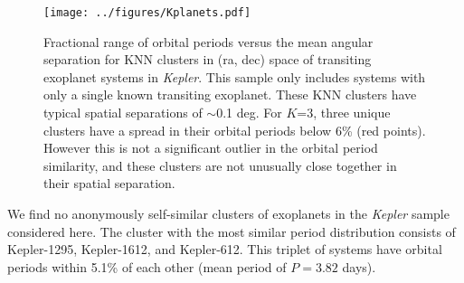 \documentclass[twocolumn]{aastex62}
\newcommand{\Kepler}{\textsl{Kepler}\xspace}
\begin{document}




\begin{figure}[!t]
\centering
\texttt{[image: ../figures/Kplanets.pdf]}
\caption{Fractional range of orbital periods versus the mean angular separation for KNN clusters in (ra, dec) space of transiting exoplanet systems in \Kepler. This sample only includes systems with only a single known transiting exoplanet. These KNN clusters have typical spatial separations of $\sim$0.1 deg. For $K$=3, three unique clusters have a spread in their orbital periods below 6\% (red points). However this is not a significant outlier in the orbital period similarity, and these clusters are not unusually close together in their spatial separation.}
\label{fig:knn}
\end{figure}


We find no anonymously self-similar clusters of exoplanets in the \Kepler sample considered here. The cluster with the most similar period distribution consists of Kepler-1295, Kepler-1612, and Kepler-612. This triplet of systems have orbital periods within 5.1\% of each other (mean period of $P=3.82$ days).





\end{document}
